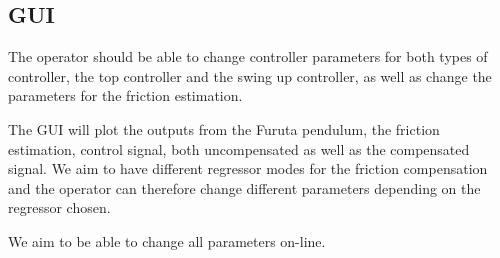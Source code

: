 \documentclass[10pt,a4paper]{article}
\begin{document}
\subsection{GUI}
The operator should be able to change controller parameters for both types of controller, the top controller and the swing up controller, as well as change the parameters for the friction estimation. 

The GUI will plot the outputs from the Furuta pendulum, the friction estimation, control signal, both uncompensated as well as the compensated signal. We aim to have different regressor modes for the friction compensation and the operator can therefore change different parameters depending on the regressor chosen. 

We aim to be able to change all parameters on-line.
\end{document}
